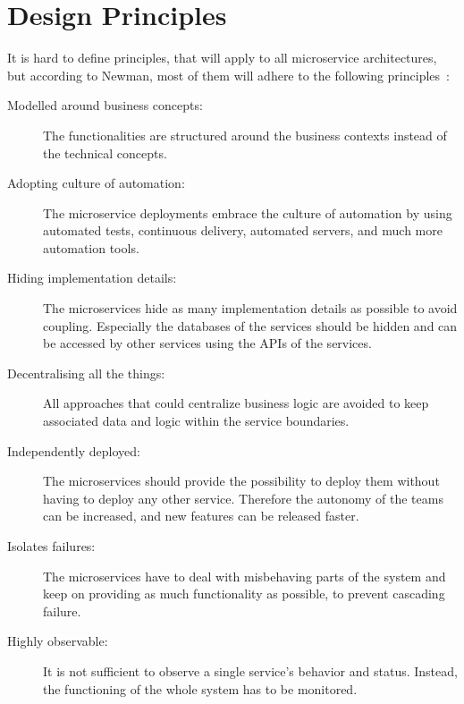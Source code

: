 \section{Design Principles}
It is hard to define principles, that will apply to all microservice architectures, but according to Newman, most of them will adhere to the following principles~\cite{newman2021building}: 
\begin{description}
    \item[Modelled around business concepts:] The functionalities are structured around the business contexts instead of the technical concepts.
    \item[Adopting culture of automation:] The microservice deployments embrace the culture of automation by using automated tests, continuous delivery, automated servers, and much more automation tools.
    \item[Hiding implementation details:] The microservices hide as many implementation details as possible to avoid coupling.
		Especially the databases of the services should be hidden and can be accessed by other services using the APIs of the services.
    \item[Decentralising all the things:] All approaches that could centralize business logic are avoided to keep associated data and logic within the service boundaries.
    \item[Independently deployed:] The microservices should provide the possibility to deploy them without having to deploy any other service.
		Therefore the autonomy of the teams can be increased, and new features can be released faster.
    \item[Isolates failures:] The microservices have to deal with misbehaving parts of the system and keep on providing as much functionality as possible, to prevent cascading failure.
    \item[Highly observable:] It is not sufficient to observe a single service's behavior and status.
		Instead, the functioning of the whole system has to be monitored.
\end{description}

